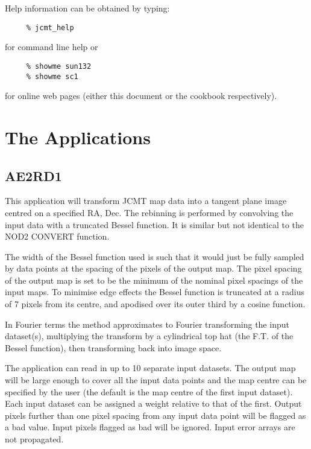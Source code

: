 \documentclass[twoside,11pt]{article}
\newcommand{\xlabel}[1]{}
\renewcommand{\_}{\texttt{\symbol{95}}}
\begin{document}
Help information can be obtained by typing:

\begin{verbatim}
     % jcmt_help
\end{verbatim}

for command line help or

\begin{verbatim}
     % showme sun132
     % showme sc1
\end{verbatim}

for online web pages (either this document or the cookbook respectively).

\goodbreak

\section{The Applications\xlabel{the_applications}}

\subsection{\xlabel{AE2RD1}AE2RD1}

This application will transform JCMT map data into a tangent  plane
image centred on a specified RA, Dec. The rebinning is performed by
convolving the input data with a truncated Bessel function. It is
similar but not identical to the NOD2 CONVERT function.

The width of the Bessel function used is such that it would just be
fully  sampled by data points at the spacing of the pixels of the
output  map. The pixel spacing of the output map is set to be the
minimum  of the nominal pixel spacings of the input maps. To minimise
edge  effects the Bessel function is truncated at a radius of 7 pixels
from its centre, and apodised over its outer third by a cosine
function.

In Fourier terms the method approximates to Fourier transforming the
input dataset(s), multiplying the transform by a cylindrical top hat
(the F.T. of the Bessel function), then transforming back into image
space.

The application can read in up to 10 separate input datasets. The
output map will be large enough to cover all the input data  points
and the map centre can be specified by the user (the  default is the
map centre of the first input dataset). Each input  dataset can be
assigned a weight relative to that of the first.  Output pixels
further than one pixel spacing from any input data  point will be
flagged as a bad value. Input pixels flagged as bad will be ignored.
Input error arrays are not propagated.
\end{document}
